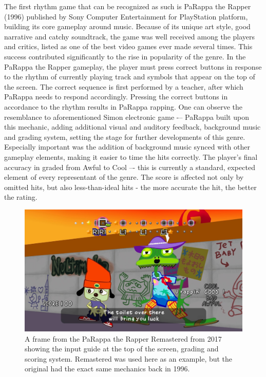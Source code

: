 The first rhythm game that can be recognized as such is PaRappa the Rapper (1996) published by Sony Computer Entertainment for PlayStation platform, building its core gameplay around music. Because of its unique art style, good narrative and catchy soundtrack, the game was well received among the players and critics, listed as one of the best video games ever made several times. \cite{acclaimed_videogames_parappa} This success contributed significantly to the rise in popularity of the genre. In the PaRappa the Rapper gameplay, the player must press correct buttons in response to the rhythm of currently playing track and symbols that appear on the top of the screen. The correct sequence is first performed by a teacher, after which PaRappa needs to respond accordingly. Pressing the correct buttons in accordance to the rhythm results in PaRappa rapping. One can observe the resemblance to aforementioned Simon electronic game -– PaRappa built upon this mechanic, adding additional visual and  auditory feedback, background music and grading system, setting the stage for further developments of this genre. Especially important was the addition of background music synced with other gameplay elements, making it easier to time the hits correctly. The player's final accuracy in graded from Awful to Cool –- this is currently a standard, expected element of every representant of the genre. The score is affected not only by omitted hits, but also less-than-ideal hits - the more accurate the hit, the better the rating.

\begin{figure}[h]
    \centering\includegraphics[scale=0.25]{obrazki/parappatherapper.jpg}
    \caption{A frame from the PaRappa the Rapper Remastered from 2017 showing the input guide at the top of the screen, grading and scoring system. Remastered was used here as an example, but the original had the exact same mechanics back in 1996. \cite{parappatherapper}}
    \label{fig:parappa_the_rapper}
\end{figure}

